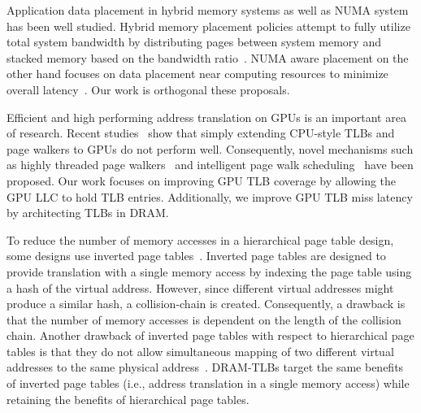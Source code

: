  Application data
placement in hybrid memory systems as well as NUMA system has been
well studied. Hybrid memory placement policies attempt to fully
utilize total system bandwidth by distributing pages between system
memory and stacked memory based on the bandwidth
ratio~\cite{bwa,batman}. NUMA aware placement on the other hand
focuses on data placement near computing resources to minimize overall
latency~\cite{numa-traffic, numa-OSsupport, numa-bolosky}. Our work is
orthogonal these proposals.

 Efficient and
high performing address translation on GPUs is an important area of
research. Recent studies~\cite{power2014supporting, pichaigpu} show
that simply extending CPU-style TLBs and page walkers to GPUs do not
perform well. Consequently, novel mechanisms such as highly threaded
page walkers~\cite{power2014supporting} and intelligent page walk
scheduling~\cite{pichaigpu} have been proposed. Our work focuses on
improving GPU TLB coverage by allowing the GPU LLC to hold TLB
entries. Additionally, we improve GPU TLB miss latency by architecting TLBs in DRAM.

 To reduce the number of memory
accesses in a hierarchical page table design, some designs use
inverted page tables~\cite{invertedPT,invertedPT2}. Inverted page
tables are designed to provide translation with a single memory access
by indexing the page table using a hash of the virtual address.
However, since different virtual addresses might produce a similar
hash, a collision-chain is created. Consequently, a drawback is that
the number of memory accesses is dependent on the length of the
collision chain. Another drawback of inverted page tables with respect
to hierarchical page tables is that they do not allow simultaneous
mapping of two different virtual addresses to the same physical
address~\cite{invertedPT}. DRAM-TLBs target the same benefits of
inverted page tables (i.e., address translation in a single memory
access) while retaining the benefits of hierarchical page tables.



